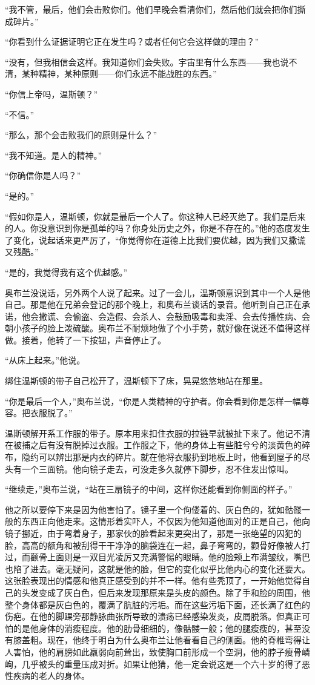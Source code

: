 ``我不管，最后，他们会击败你们。他们早晚会看清你们，然后他们就会把你们撕成碎片。''

``你看到什么证据证明它正在发生吗？或者任何它会这样做的理由？''

``没有，但我相信会这样。我知道你们会失败。宇宙里有什么东西------我也说不清，某种精神，某种原则------你们永远不能战胜的东西。''

``你信上帝吗，温斯顿？''

``不信。''

``那么，那个会击败我们的原则是什么？''

``我不知道。是人的精神。''

``你确信你是人吗？''

``是的。''

``假如你是人，温斯顿，你就是最后一个人了。你这种人已经灭绝了。我们是后来的人。你没意识到你是孤单的吗？你身处历史之外，你是不存在的。''他的态度发生了变化，说起话来更严厉了，``你觉得你在道德上比我们要优越，因为我们又撒谎又残酷。''

``是的，我觉得我有这个优越感。''

奥布兰没说话，另外两个人说了起来。过了一会儿，温斯顿意识到其中一个人是他自己。那是他在兄弟会登记的那个晚上，和奥布兰谈话的录音。他听到自己正在承诺，他会撒谎、会偷盗、会造假、会杀人、会鼓励吸毒和卖淫、会去传播性病、会朝小孩子的脸上泼硫酸。奥布兰不耐烦地做了个小手势，就好像在说还不值得这样做。接着，他转了一下按钮，声音停止了。

``从床上起来。''他说。

绑住温斯顿的带子自己松开了，温斯顿下了床，晃晃悠悠地站在那里。

``你是最后一个人，''奥布兰说，``你是人类精神的守护者。你会看到你是怎样一幅尊容。把衣服脱了。''

温斯顿解开系工作服的带子。原本用来扣住衣服的拉链早就被扯下来了。他记不清在被捕之后有没有脱掉过衣服。工作服之下，他的身体上有些脏兮兮的淡黄色的碎布，隐约可以辨出那是内衣的碎片。就在他将衣服扔到地板上时，他看到屋子的尽头有一个三面镜。他向镜子走去，可没走多久就停下脚步，忍不住发出惊叫。

``继续走，''奥布兰说，``站在三扇镜子的中间，这样你还能看到你侧面的样子。''

他之所以要停下来是因为他害怕了。镜子里一个佝偻着的、灰白色的，犹如骷髅一般的东西正向他走来。这情形着实吓人，不仅因为他知道他面对的正是自己，他向镜子挪近，由于弯着身子，那家伙的脸看起来更突出了，那是一张绝望的囚犯的脸，高高的额角和被刮得干干净净的脑袋连在一起，鼻子弯弯的，颧骨好像被人打过，而颧骨上面则是一双目光凌厉又充满警惕的眼睛。他的脸颊上布满皱纹，嘴巴也陷了进去。毫无疑问，这就是他的脸，但它的变化似乎比他内心的变化还要大。这张脸表现出的情感和他真正感受到的并不一样。他有些秃顶了，一开始他觉得自己的头发变成了灰白色，但后来发现那原来是头皮的颜色。除了手和脸的周围，他整个身体都是灰白色的，覆满了肮脏的污垢。而在这些污垢下面，还长满了红色的伤疤。在他的脚踝旁那静脉曲张所导致的溃疡已经感染发炎，皮屑脱落。但真正可怕的是他身体的消瘦程度。他的肋骨细细的，像骷髅一般；他的腿瘦瘦的，甚至没有膝盖粗。现在，他终于明白为什么奥布兰让他看看自己的侧面。他的脊椎弯得让人害怕，他的肩膀如此羸弱向前耸出，致使胸口前形成一个空洞，他的脖子瘦骨嶙峋，几乎被头的重量压成对折。如果让他猜，他一定会说这是一个六十岁的得了恶性疾病的老人的身体。

